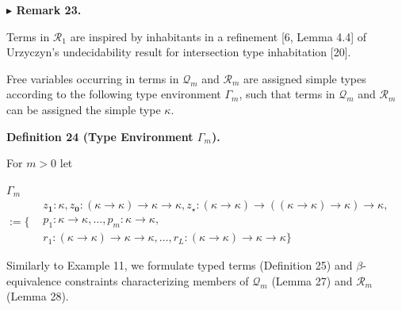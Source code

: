 \documentclass[10pt,a4paper]{amsart}
\begin{document}
\par\medskip\noindent\textbf{$\blacktriangleright$ Remark 23.}\par
 
 
Terms in $\mathcal{R}_{1}$ are inspired by inhabitants in a refinement [6, Lemma 4.4] of Urzyczyn’s undecidability result for intersection type inhabitation [20].\par
 
 
 
 
Free variables occurring in terms in $\mathcal{Q}_{m}$ and $\mathcal{R}_{m}$ are assigned simple types according to the following type environment $\Gamma_{m}$, such that terms in $\mathcal{Q}_{m}$ and $\mathcal{R}_{m}$ can be assigned the simple type $\kappa$.\par
 
 
 
\par\medskip\noindent\textbf{Definition 24 (Type Environment $\Gamma_{m}$).}\par
 
 
For $m>0$ let\par
    $\displaystyle\Gamma_{m}$ $\displaystyle:=\{\begin{aligned} &z_{\mathbf{1}}:\kappa,z_{\mathbf{0}}:(\kappa%
\to\kappa)\to\kappa\to\kappa,z_{\star}:(\kappa\to\kappa)\to((\kappa\to\kappa)%
\to\kappa)\to\kappa,\\
&p_{1}:\kappa\to\kappa,\ldots,p_{m}:\kappa\to\kappa,\\
&r_{1}:(\kappa\to\kappa)\to\kappa\to\kappa,\ldots,r_{L}:(\kappa\to\kappa)\to%
\kappa\to\kappa\}\end{aligned}$    
 
 
 
Similarly to Example 11, we formulate typed terms (Definition 25) and $\beta$-equivalence constraints characterizing members of $\mathcal{Q}_{m}$ (Lemma 27) and $\mathcal{R}_{m}$ (Lemma 28).\par
 
 
 
\end{document}
